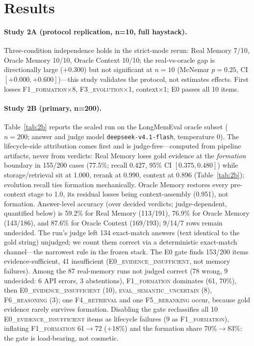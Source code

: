 \documentclass[11pt]{article}
\newcommand{\fone}{F1\textsc{\_formation}}
\newcommand{\fthree}{F3\textsc{\_evolution}}
\newcommand{\ffour}{F4\textsc{\_retrieval}}
\newcommand{\ffive}{F5\textsc{\_reranking}}
\newcommand{\fsix}{F6\textsc{\_reasoning}}
\newcommand{\ezero}{E0\textsc{\_evidence\_insufficient}}
\newcommand{\evaluncertain}{\textsc{eval\_semantic\_uncertain}}
\begin{document}
\section{Results}
\label{sec:results}

\paragraph{Study 2A (protocol replication, n=10, full haystack).}
Three-condition independence holds in the strict-mode rerun: Real Memory
7/10, Oracle Memory 10/10, Oracle Context 10/10; the real-vs-oracle gap
is directionally large ($+0.300$) but not significant at $n{=}10$
(McNemar $p{=}0.25$, CI $[+0.000, +0.600]$)---this study validates the
protocol, not estimates effects. First losses \fone{}$\times$8,
\fthree{}$\times$1, context$\times$1; E0 passes all 10 items.

\paragraph{Study 2B (primary, n=200).}
Table~\ref{tab:2b} reports the scaled run on the LongMemEval oracle
subset ($n{=}200$; answer and judge model \texttt{deepseek-v4.1-flash},
temperature 0). The lifecycle-side attribution comes first and is
judge-free---computed from pipeline artifacts, never from verdicts:
Real Memory loses gold evidence at the \emph{formation} boundary in
155/200 cases (77.5\%; recall 0.427, 95\% CI $[0.375, 0.480]$) while
storage/retrieval sit at 1.000, rerank at 0.990, context at 0.896
(Table~\ref{tab:2b}); evolution recall ties formation mechanically.
Oracle Memory restores every pre-context stage to 1.0, its residual
losses being context-assembly (0.951), not formation. Answer-level
accuracy (over decided verdicts; judge-dependent, quantified below) is
59.2\% for Real Memory (113/191), 76.9\% for Oracle Memory (143/186),
and 87.6\% for Oracle Context (169/193); 9/14/7 rows remain undecided.
The run's judge left 134 exact-match answers (text identical to the gold
string) unjudged; we count them correct via a deterministic exact-match
channel---the narrowest rule in the frozen stack. The E0 gate finds
153/200 items evidence-sufficient, 41 insufficient (\ezero{}, not memory
failures). Among the 87 real-memory runs not judged correct
(78 wrong, 9 undecided: 6 API errors, 3 abstentions), \fone{} dominates
(61, 70\%), then \ezero{} (10), \evaluncertain{} (8), \fsix{} (3); one
\ffour{} and one \ffive{} occur, because gold evidence rarely survives
formation. Disabling the gate reclassifies all 10 \ezero{} items as
lifecycle failures (9 as \fone{}), inflating \fone{} 61$\to$72 (+18\%)
and the formation share 70\%$\to$83\%: the gate is load-bearing, not
cosmetic.
\end{document}
